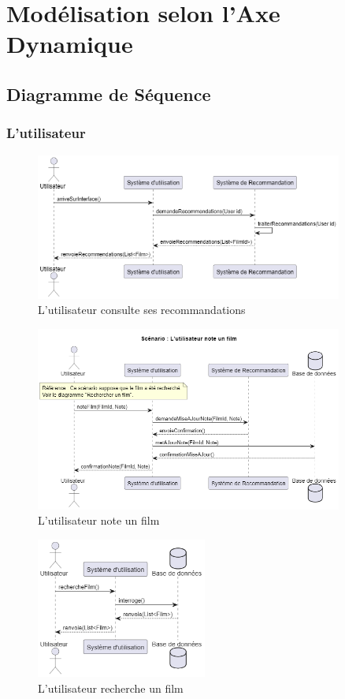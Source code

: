 \documentclass{article}
\begin{document}
\section{Modélisation selon l'Axe Dynamique}
\subsection{Diagramme de Séquence}
\subsubsection{L'utilisateur}
\begin{figure}[H]
    \centering
    \includegraphics[width=0.9\textwidth]{images/sequence/user/seq_user_1.png}
    \caption{L'utilisateur consulte ses recommandations}
\end{figure}
\begin{figure}[H]
    \centering
    \includegraphics[width=0.9\textwidth]{images/sequence/user/seq_user_2.png}
    \caption{L'utilisateur note un film}
\end{figure}
\begin{figure}[H]
    \centering
    \includegraphics[width=0.5\textwidth]{images/sequence/user/seq_user_3.png}
    \caption{L'utilisateur recherche un film}
\end{figure}
\end{document}
